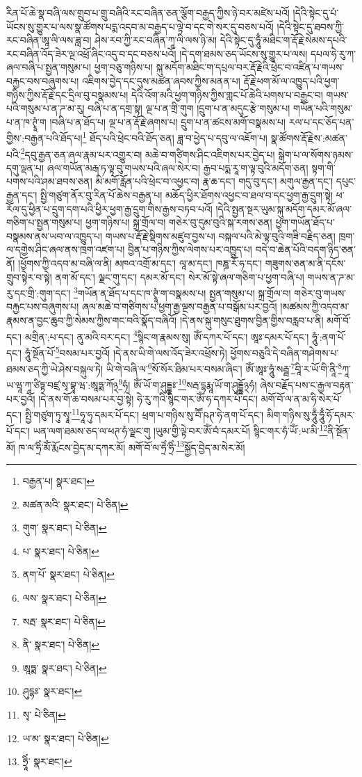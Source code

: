 རིན་པོ་ཆེ་སྣ་བཞི་ལས་གྲུབ་པ་གྲུ་བཞིའི་རང་བཞིན་ཅན་ལྕོག་བརྒྱད་ཀྱིས་ཉེ་བར་མཛེས་པའོ། །དེའི་སྟེང་དུ་པཾ་ཡོངས་སུ་གྱུར་པ་ལས་སྣ་ཚོགས་པདྨ་འདབ་མ་བརྒྱད་པ་ལྟེ་བ་དང་གེ་སར་དུ་བཅས་པའོ། །དེའི་སྟེང་དུ་ཐབས་ཀྱི་རང་བཞིན་ཨཱ་ལི་ལས་ཟླ་བ། ཤེས་རབ་ཀྱི་རང་བཞིན་ཀཱ་ལི་ལས་ཉི་མ། དེའི་སྟེང་དུ་ཧཱུྃ་མཐིང་ག་རྡོ་རྗེ་སེམས་དཔའི་རང་བཞིན་འོད་ཟེར་ལྔ་འཕྲོ་ཞིང་འདུ་བ་དང་བཅས་པའོ། །དེ་དག་ཐམས་ཅད་ཡོངས་སུ་གྱུར་པ་ལས། དཔལ་ཧེ་རུ་ཀ་ཞལ་བཞི་པ་སྤྱན་གསུམ་པ། ཕྱག་བཅུ་གཉིས་པ། སྐུ་མདོག་མཐིང་ག་དཔྲལ་བར་རྡོ་རྗེའི་ཕྲེང་བ་འཛིན་པ་གཡས་བརྐྱང་བས་བཞུགས་པ། འཇིགས་བྱེད་དང་དུས་མཚན་ཞབས་ཀྱིས་མནན་པ། རྡོ་རྗེ་ཕག་མོ་ལ་འཁྱུད་པའི་ཕྱག་གཉིས་ཀྱིས་རྡོ་རྗེ་དང་དྲིལ་བུ་བསྣམས་པ། དེའི་འོག་མའི་ཕྱག་གཉིས་ཀྱིས་གླང་པོ་ཆེའི་པགས་པ་བརྒྱང་བ། གཡས་པའི་གསུམ་པ་ན་ཌ་མ་རུ། བཞི་པ་ན་དགྲ་སྟ། ལྔ་པ་ན་གྲི་གུག །དྲུག་པ་ན་མདུང་རྩེ་གསུམ་པ། གཡོན་པའི་གསུམ་པ་ན་ཁ་ཊྭཱཾ་ག །བཞི་པ་ན་ཐོད་པ། ལྔ་པ་ན་རྡོ་རྗེ་ཞགས་པ། དྲུག་པ་ན་ཚངས་མགོ་བསྣམས་པ། རལ་པ་དང་ཅོད་པན་གྱིས་:བརྒྱན་པའི་ཐོད་པ།\footnote{བརྒྱན་པ།  སྣར་ཐང་། } ཐོད་པའི་ཕྲེང་བའི་ཐོད་ཅན། ཟླ་བ་ཕྱེད་པ་དབུ་ལ་འཇོག་པ། སྣ་ཚོགས་རྡོ་རྗེས་:མཚན་པའི་\footnote{མཚན་མའི་  སྣར་ཐང་།  པེ་ཅིན། }དབུ་རྒྱན་ཅན་ཞལ་རྣམ་པར་འགྱུར་བ། མཆེ་བ་གཙིགས་ཤིང་འཇིགས་པར་བྱེད་པ། སྒེག་པ་ལ་སོགས་ཉམས་དགུ་ལྡན་པ། ཞལ་གཡོན་མརྒ་ཏ་ལྟ་བུ་གཡས་པའི་ཞལ་སེར་བ། རྒྱབ་པདྨ་རཱ་ག་ལྟ་བུའི་མདོག་ཅན། སྟག་གི་པགས་པའི་ཤམ་ཐབས་ཅན། མི་མགོ་རློན་པའི་ཕྲེང་བ་འཕྱང་བ། རྣ་ཆ་དང་། གདུ་བུ་དང་། མགུལ་རྒྱན་དང་། དཔུང་རྒྱན་དང་། སྤྱི་གཙུག་ནོར་བུ་རིན་པོ་ཆེས་བརྒྱན་པ། མཆོད་ཕྱིར་ཐོགས་འཕྱང་བ་ཐལ་བ་དང་ཕྱག་རྒྱ་དྲུག་སྟེ། ཕ་རོལ་དུ་ཕྱིན་པ་དྲུག་དག་པའི་ཕྱིར་ཕྱག་རྒྱ་དྲུག་གིས་རྒྱས་བཏབ་པའོ། །དེའི་སྤྱན་སྔར་ཡུམ་སྐུ་མདོག་དམར་མོ་ཞལ་གཅིག་པ་སྤྱན་གསུམ་པ། ཕྱག་གཉིས་པ། སྐྲ་གྲོལ་བ། གཅེར་བུ་དུམ་བུའི་སྐ་རགས་ཅན། ཕྱག་གཡོན་ཐོད་པ་བསྣམས་ནས་ཡབ་ལ་འཁྱུད་པ། གཡས་པ་རྡོ་རྗེ་སྡིགས་མཛུབ་བྱས་པ། བསྐལ་པའི་མེ་ལྟ་བུའི་གཟི་བརྗིད་ཅན། ཁྲག་ལ་དགྱེས་ཤིང་ཞལ་ནས་ཁྲག་འཛག་པ། བྱིན་པ་གཉིས་ཀྱིས་ལེགས་པར་འཁྱུད་པ། བདེ་བ་ཆེན་པོའི་བདག་ཉིད་ཅན་ནོ། །ཕྱོགས་ཀྱི་འདབ་མ་བཞི་ལ་ནི། མཁའ་འགྲོ་མ་དང་། ལཱ་མ་དང་། ཁཎྜ་རོ་ཧ་དང་། གཟུགས་ཅན་མ་ནི་དངོས་གྲུབ་སྟེར་བ་སྟེ། ནག་མོ་དང་། ལྗང་གུ་དང་། དམར་མོ་དང་། སེར་མོ་སྟེ་ཞལ་གཅིག་པ་ཕྱག་བཞི་པ། གཡས་ན་ཌ་མ་རུ་དང་གྲི་:གུག་དང་། \footnote{གུག་  སྣར་ཐང་།  པེ་ཅིན། }གཡོན་ན་ཐོད་པ་དང་ཁ་ཊྭཱཾ་ག་བསྣམས་པ། སྤྱན་གསུམ་པ། སྐྲ་གྲོལ་བ། གཅེར་བུ་གཡས་བརྐྱང་པས་བཞུགས་པ། ཞལ་མཆེ་བ་གཙིགས་པ་ཕྱག་རྒྱ་ལྔས་བརྒྱན་པ་བསྒོམ་པར་བྱའོ། །མཚམས་ཀྱི་འདབ་མ་རྣམས་ན་བྱང་ཆུབ་ཀྱི་སེམས་ཀྱིས་གང་བའི་སྣོད་བཞིའོ། །དེ་ནས་སྐུ་གསུང་ཐུགས་བྱིན་གྱིས་བརླབ་པ་ནི། མགོ་བོ་དང་། མགྲིན་:པ་དང་། ནུ་མའི་བར་དང་། \footnote{པ་  སྣར་ཐང་།  པེ་ཅིན། }སྙིང་ག་རྣམས་སུ། ཨོཾ་དཀར་པོ་དང་། ཨཱཿ་དམར་པོ་དང་། ཧཱུཾ་:ནག་པོ་དང་། ཧཱུཾ་སྔོན་པོ་\footnote{ནག་པོ་  སྣར་ཐང་།  པེ་ཅིན། }བསམ་པར་བྱའོ། །དེ་ནས་ཡི་གེ་ལས་འོད་ཟེར་འཕྲོས་ཏེ། ཕྱོགས་བཅུའི་དེ་བཞིན་གཤེགས་པ་ཐམས་ཅད་ཀྱི་ཡེ་ཤེས་བསྐུལ་ཏེ། ཡི་གེ་བཞི་ལ་\footnote{ལས་  སྣར་ཐང་།  པེ་ཅིན། }སོ་སོར་ཐིམ་པར་བསམ་ཞིང་། ཨོཾ་ཨཱཿ་ཧཱུཾ་སརྦྦ་\footnote{སརྦ་  སྣར་ཐང་།  པེ་ཅིན། }བཱི་ར་ཡོ་གི་ནཱི་\footnote{ནི་  སྣར་ཐང་།  པེ་ཅིན། }ཀཱ་ཡ་ཝཱ་ཀཱ་ཙིཏྟ་བཛྲ་སྭ་བྷཱ་ཝ་:ཨཱཏྨ་ཀོ྅\footnote{ཨཱཏྨ་  སྣར་ཐང་།  པེ་ཅིན། }ཧཾ། ཨོཾ་ཡོ་ག་ཤུདྡྷཿ་\footnote{ཤུདྷཿ་  སྣར་ཐང་། }སརྦ་དྷརྨཱ་ཡོ་ག་ཤུདྡྷོ྅ཧཾ། ཞེས་བརྗོད་པས་ང་རྒྱལ་བརྟན་པར་བྱའོ། །དེ་ནས་གོ་ཆ་བསམ་པར་བྱ་སྟེ། ཧེ་རུ་ཀའི་སྙིང་གར་ཨོཾ་ཧ་དཀར་པོ་དང་། མགོ་བོ་ལ་ན་མ་ཧི་སེར་པོ་དང་། སྤྱི་གཙུག་ཏུ་སྭཱ་\footnote{སྭ་  པེ་ཅིན། }ཧཱ་ཧུ་དམར་པོ་དང་། ཕྲག་པ་གཉིས་སུ་བཽ་ཥཊ་ཧེ་ནག་པོ་དང་། མིག་གཉིས་སུ་ཧཱུྃ་ཧཱུྃ་ཧོ་དམར་པོ་དང་། ཡན་ལག་ཐམས་ཅད་ལ་ཕཊ་ཧཾ་ལྗང་གུ །ཡུམ་གྱི་ལྟེ་བར་ཨོཾ་བཾ་དམར་པོ། སྙིང་གར་ཧཾ་ཡོཾ་:ཡ་མི་\footnote{ཡ་མ་  སྣར་ཐང་།  པེ་ཅིན། }ནི་སྔོན་མོ། ཁ་ལ་ཧྲིཾ་མོཾ་རྨོངས་བྱེད་མ་དཀར་མོ། མགོ་བོ་ལ་ཧྲེཾ་ཧྲིཾ་\footnote{ཧྲཱིཾ་  སྣར་ཐང་། }སྐྱོད་བྱེད་མ་སེར་མོ། 